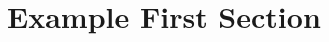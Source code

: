 \documentclass[12pt, doubleside, a4paper]{report}
\begin{document}
\maketitle
\tableofcontents
\pagebreak

\section{Example First Section}
\end{document}
